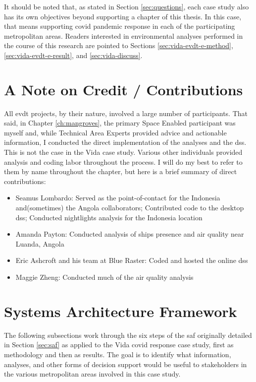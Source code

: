 It should be noted that, as stated in Section \ref{sec:questions}, each case study also has its own objectives beyond supporting a chapter of this thesis. In this case, that means supporting \ac{covid} pandemic response in each of the participating metropolitan areas. Readers interested in environmental analyses performed in the course of this research are pointed to Sections \ref{sec:vida-evdt-e-method}, \ref{sec:vida-evdt-e-result}, and \ref{sec:vida-discuss}.

\section{A Note on Credit / Contributions}

All \ac{evdt} projects, by their nature, involved a large number of participants. That said, in Chapter \ref{ch:mangroves}, the primary Space Enabled participant was myself and, while Technical Area Experts provided advice and actionable information, I conducted the direct implementation of the analyses and the \ac{dss}. This is not the case in the Vida case study. Various other individuals provided analysis and coding labor throughout the process. I will do my best to refer to them by name throughout the chapter, but here is a brief summary of direct contributions:

\begin{itemize}[itemsep=0pt,parsep=0pt]
	\item{Seamus Lombardo: Served as the point-of-contact for the Indonesia and(sometimes) the Angola collaborators; Contributed code to the desktop \ac{dss}; Conducted nightlights analysis for the Indonesia location}
	\item{Amanda Payton: Conducted analysis of ships presence and air quality near Luanda, Angola}
	\item{Eric Ashcroft and his team at Blue Raster: Coded and hosted the online \ac{dss}}
	\item{Maggie Zheng: Conducted much of the air quality analysis}
\end{itemize}


\section{Systems Architecture Framework} \label{sec:vida-saf}

The following subsections work through the six steps of the \ac{saf} originally detailed in Section \ref{sec:saf} as applied to the Vida \ac{covid} response case study, first as methodology and then as results. The goal is to identify what information, analyses, and other forms of decision support would be useful to stakeholders in the various metropolitan areas involved in this case study.

